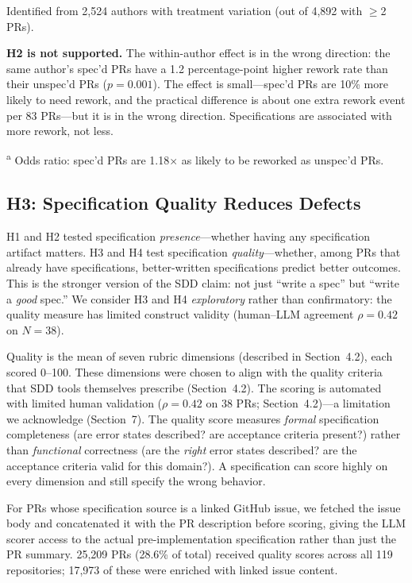 \documentclass[a4paper,UKenglish,cleveref,autoref,thm-restate]{lipics-v2021}
\begin{document}
Identified from 2,524 authors with treatment variation (out of 4,892 with $\geq$2 PRs).

\textbf{H2 is not supported.} The within-author effect is in the wrong direction: the same author's spec'd PRs have a 1.2 percentage-point higher rework rate than their unspec'd PRs ($p = 0.001$). The effect is small---spec'd PRs are 10\% more likely to need rework, and the practical difference is about one extra rework event per 83 PRs---but it is in the wrong direction. Specifications are associated with more rework, not less.

{\small \textsuperscript{a} Odds ratio: spec'd PRs are 1.18$\times$ as likely to be reworked as unspec'd PRs.}

\subsection{H3: Specification Quality Reduces Defects}

\noindent
H1 and H2 tested specification \emph{presence}---whether having any specification artifact matters. H3 and H4 test specification \emph{quality}---whether, among PRs that already have specifications, better-written specifications predict better outcomes. This is the stronger version of the SDD claim: not just ``write a spec'' but ``write a \emph{good} spec.'' We consider H3 and H4 \emph{exploratory} rather than confirmatory: the quality measure has limited construct validity (human--LLM agreement $\rho = 0.42$ on $N = 38$).

Quality is the mean of seven rubric dimensions (described in Section~4.2), each scored 0--100. These dimensions were chosen to align with the quality criteria that SDD tools themselves prescribe (Section~4.2). The scoring is automated with limited human validation ($\rho = 0.42$ on 38 PRs; Section~4.2)---a limitation we acknowledge (Section~7). The quality score measures \emph{formal} specification completeness (are error states described? are acceptance criteria present?) rather than \emph{functional} correctness (are the \emph{right} error states described? are the acceptance criteria valid for this domain?). A specification can score highly on every dimension and still specify the wrong behavior.

For PRs whose specification source is a linked GitHub issue, we fetched the issue body and concatenated it with the PR description before scoring, giving the LLM scorer access to the actual pre-implementation specification rather than just the PR summary. 25,209 PRs (28.6\% of total) received quality scores across all 119 repositories; 17,973 of these were enriched with linked issue content.
\end{document}
